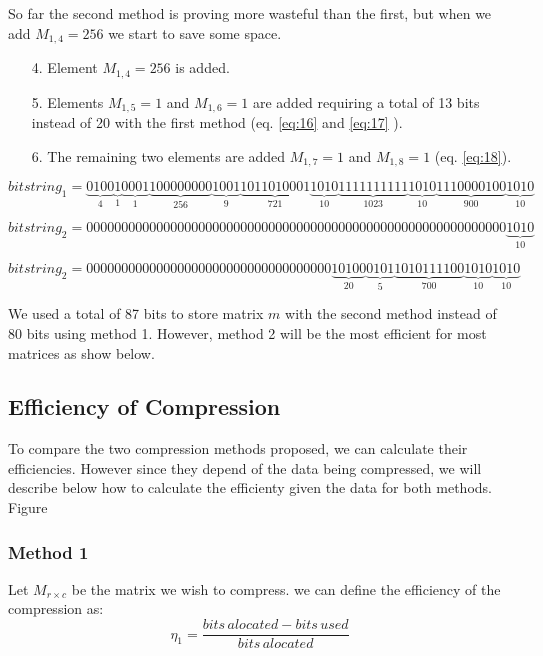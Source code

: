 \documentclass[10pt]{article}
\begin{document}
So far the second method is proving more wasteful than the first, but when we add $M_{1,4} =256$  we start to save some space.

\begin{enumerate}
 \item[4.] Element $M_{1,4} =256$ is added.  
 \item [5.] Elements $M_{1,5} =1$ and $M_{1,6} =1$ are added requiring a total of 13 bits instead of 20 with the first method (eq. \ref{eq:16} and \ref{eq:17} ).
 \item [6.] The remaining two elements are added $M_{1,7} =1$ and $M_{1,8} =1$ (eq. \ref{eq:18}).
\end{enumerate}

\begin{equation} \label{eq:16}
 bitstring_1 =
 \underbrace{0100}_{4}\underbrace{1}_{1}\underbrace{0001}_{1}\underbrace{100000000}_{256}\underbrace{1001}_{9}\underbrace{1011010001}_{721}\underbrace{1010}_{10}\underbrace{1111111111}_{1023}\underbrace{1010}_{10}\underbrace{1110000100}_{900}\underbrace{1010}_{10}
\end{equation}

\begin{equation} \label{eq:17}
 bitstring_2 = 000000000000000000000000000000000000000000000000000000000000\underbrace{1010}_{10}
\end{equation}

\begin{equation} \label{eq:18}
 bitstring_2 = 00000000000000000000000000000000000\underbrace{10100}_{20}\underbrace{0101}_{5}\underbrace{1010111100}_{700}\underbrace{1010}_{10}\underbrace{1010}_{10}
\end{equation}

 We used a total of 87 bits to store matrix $m$ with the second method instead of 80 bits using method 1. However, method 2 will be the most efficient for most matrices as show below.
 
 \subsection*{Efficiency of Compression}
 To compare the two compression methods proposed, we can calculate their efficiencies. However since they depend of the data being compressed, we will describe below how to  calculate the efficienty given the data for both methods. Figure 
 
 \subsubsection*{Method 1}
 Let $M_{r \times c}$ be the matrix we wish to compress. we can define the efficiency of the compression as:
 \begin{equation}\label{eq:eff1}
  \eta_1=\frac{bits\, alocated-bits\, used}{bits\,alocated}
 \end{equation}
\end{document}
